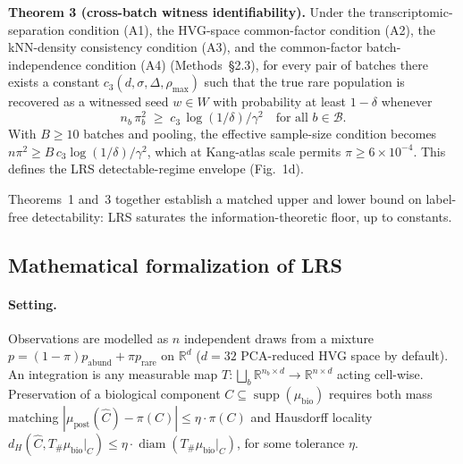 \textbf{Theorem 3 (cross-batch witness identifiability).}
Under the transcriptomic-separation condition (A1), the HVG-space common-factor condition (A2), the kNN-density consistency condition (A3), and the common-factor batch-independence condition (A4) (Methods~\S2.3), for every pair of batches there exists a constant $c_3(d, \sigma, \Delta, \rho_{\max})$ such that the true rare population is recovered as a witnessed seed $w\in W$ with probability at least $1-\delta$ whenever
\begin{equation}
  n_b\,\pi_b^{2} \;\geq\; c_{3}\,\log(1/\delta)/\gamma^{2}
  \quad\text{for all } b \in \mathcal{B}.
  \label{eq:identifiability}
\end{equation}
With $B\geq 10$ batches and pooling, the effective sample-size condition becomes $n\pi^{2}\geq B\,c_3\log(1/\delta)/\gamma^{2}$, which at Kang-atlas scale permits $\pi\geq 6\times 10^{-4}$. This defines the LRS detectable-regime envelope (Fig.~1d).

Theorems~1 and~3 together establish a matched upper and lower bound on label-free detectability: LRS saturates the information-theoretic floor, up to constants.


\subsection*{Mathematical formalization of LRS}

\paragraph{Setting.}
Observations are modelled as $n$ independent draws from a mixture $p = (1-\pi)p_{\text{abund}} + \pi p_{\text{rare}}$ on $\mathbb{R}^{d}$ ($d=32$ PCA-reduced HVG space by default). An integration is any measurable map $T:\bigsqcup_{b}\mathbb{R}^{n_{b}\times d}\to \mathbb{R}^{n\times d}$ acting cell-wise. Preservation of a biological component $C\subseteq \operatorname{supp}(\mu_{\text{bio}})$ requires both mass matching $|\mu_{\text{post}}(\widehat{C}) - \pi(C)|\leq \eta\cdot \pi(C)$ and Hausdorff locality $d_{H}(\widehat{C}, T_{\#}\mu_{\text{bio}}|_{C})\leq \eta\cdot\operatorname{diam}(T_{\#}\mu_{\text{bio}}|_{C})$, for some tolerance $\eta$.

